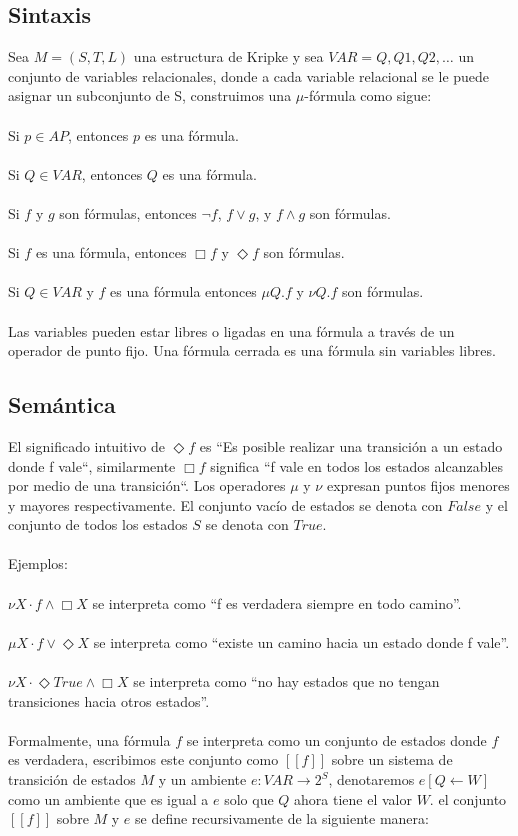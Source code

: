 \subsection{Sintaxis}

Sea $M = (S, T, L)$ una estructura de Kripke y sea $VAR = {Q, Q1, Q2, …}$ un conjunto de variables relacionales, donde a cada variable relacional se le puede asignar un subconjunto de S, construimos una $\mu$-fórmula como sigue: \\
\\
Si $p \in AP$, entonces $p$ es una fórmula. \\
\\
Si $Q \in VAR$, entonces $Q$ es una fórmula. \\
\\
Si $f$ y $g$ son fórmulas, entonces $\neg f$, $f \lor g$, y $f \land g$ son fórmulas. \\
\\
Si $f$ es una fórmula, entonces $\Box f$ y $\Diamond f$ son fórmulas. \\
\\
Si $Q \in VAR$ y $f$ es una fórmula entonces $\mu Q.f$ y $\nu Q.f$ son fórmulas. \\
\\
Las variables pueden estar libres o ligadas en una fórmula a través de un operador de punto fijo. Una fórmula cerrada es una fórmula sin variables libres.

\subsection{Semántica}

El significado intuitivo de $\Diamond f$ es “Es posible realizar una transición a un estado donde f vale“, similarmente $\Box f$ significa “f vale en todos los estados alcanzables por medio de una transición“.
Los operadores $\mu$ y $\nu$ expresan puntos fijos menores y mayores respectivamente. El conjunto vacío de estados se denota con $False$ y el conjunto de todos los estados $S$ se denota con $True$.\\
\\
Ejemplos: \\
\\
$\nu X \cdot f \land \Box X$ se interpreta como “f es verdadera siempre en todo camino”.\\
\\
$\mu X \cdot f \lor \Diamond X$ se interpreta como “existe un camino hacia un estado donde f vale”.\\
\\
$\nu X \cdot \Diamond True \land \Box X$ se interpreta como “no hay estados que no tengan transiciones hacia otros estados”.\\
\\
Formalmente, una fórmula $f$ se interpreta como un conjunto de estados donde $f$ es verdadera, escribimos este conjunto como $[[f]]$ sobre un sistema de transición de estados $M$ y un ambiente $e: VAR \to 2^{S}$, denotaremos $e[Q \gets W]$ como un ambiente que es igual a $e$ solo que $Q$ ahora tiene el valor $W$. el conjunto $[[f]]$ sobre $M$ y $e$ se define recursivamente de la siguiente manera:

